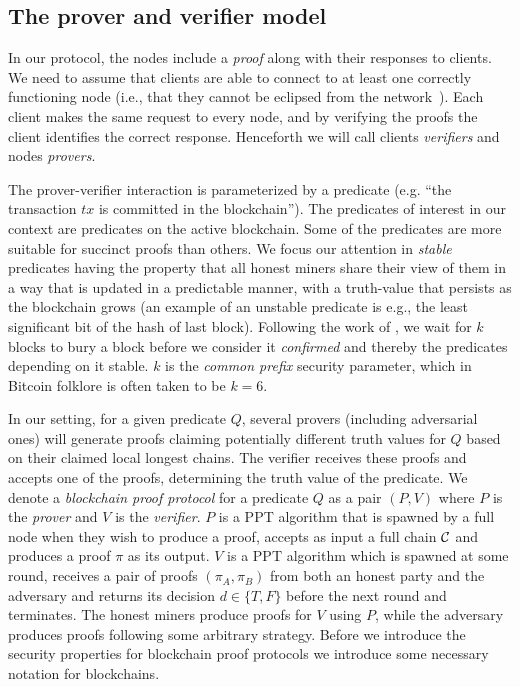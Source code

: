 \subsection{The prover and verifier model}
In our protocol, the nodes include a \emph{proof} along with their responses to
clients. We need to assume that clients are able to connect to at least one
correctly functioning node (i.e., that they cannot be eclipsed from the
network~\cite{heilman2015eclipse,hijackingbitcoin}). Each client makes the same
request to every node, and by verifying the proofs the client identifies the
correct response. Henceforth we will call clients \emph{verifiers} and nodes
\emph{provers}.

The prover-verifier interaction is parameterized by a predicate (e.g. ``the
transaction $tx$ is committed in the blockchain'').
%
The predicates of interest in our context are predicates on the active
blockchain. Some of the predicates are more suitable for succinct proofs than
others. We focus our attention in \emph{stable} predicates having the property
that all honest miners share their view of them in a way that is updated in a
predictable manner, with a truth-value that persists as the blockchain grows (an
example of an unstable predicate is e.g., the least significant bit of the hash
of last block). Following the work of \cite{backbone}, we wait for $k$ blocks to
bury a block before we consider it \emph{confirmed} and thereby the predicates
depending on it stable. $k$ is the \emph{common prefix} security parameter,
which in Bitcoin folklore is often taken to be $k = 6$.

In our setting, for a given predicate $Q$, several  provers (including
adversarial ones) will generate proofs claiming potentially different truth
values for $Q$ based on their claimed local longest chains. The verifier
receives these proofs and accepts one of the proofs, determining the truth value
of the predicate.  We denote a  \emph{blockchain proof protocol} for a
predicate $Q$ as a pair $(P, V)$ where $P$ is the \emph{prover} and $V$ is the
\emph{verifier}. $P$ is a PPT algorithm that is spawned by a full node when
they wish to produce a proof, accepts as input a full chain $\mathcal{C}$ and
produces a proof $\pi$ as its output. $V$ is a PPT algorithm which is spawned at
some round, receives a pair of proofs $(\pi_A, \pi_B)$ from both an honest party
and the adversary and returns its decision $d \in \{T, F\}$ before the
next round and terminates. The honest miners produce proofs for $V$ using $P$,
while the adversary produces proofs following some arbitrary strategy. Before we
introduce the security properties for blockchain proof protocols we introduce
some necessary notation for blockchains.

